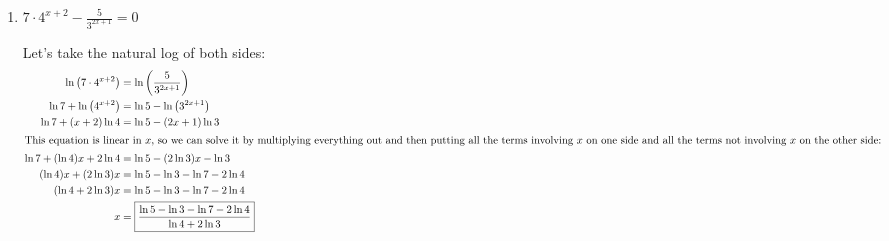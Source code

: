 \documentclass{article}
\begin{document}
\begin{enumerate}[resume]
\begin{enumerate}
    \begin{solution}
      Let's rewrite the equation so that each side consists of
      one term and then take the log base 7 of both sides.
      \begin{align*}
          49^{x} - \frac{\sqrt{7}}{7^{x^2}} &= 0 \\
          49^x &= \frac{\sqrt{7}}{7^{x^2}} \\
          \log_7(49^x) &= \log_7\!\left(\frac{\sqrt{7}}{7^{x^2}}\right)\\
          \log_7 (49^x) &= \log_7 \sqrt{7} - 
            \log_7 \left(7^{x^2}\right)\\
          x \log_7 49 &= \log_7 \sqrt{7} - x^2 \log_7 7 \\
          2x &= \tfrac{1}{2} - x^2
      \end{align*}
      We can solve this quadratic equation for $x$ using
      the quadratic formula.
      \begin{align*}
          x^2 + 2x - \tfrac{1}{2} &= 0 \\
          x &= \frac{-2 \pm \sqrt{(2)^2 - 4(1)(-\tfrac{1}{2})}}{2(1)} \\
          x &= \boxed{\frac{-2 \pm \sqrt{6}}{2}}
      \end{align*}

      
    \end{solution}

  \item

    \begin{problem}[\vfill]
      $\displaystyle 7 \cdot 4^{x + 2} - \frac{5}{3^{2x + 1}} = 0$
    \end{problem}

    \begin{solution}
      Let's take the natural log of both sides:
      \begin{align*}
        \ln \left( 7 \cdot 4^{x + 2} \right) &= \ln \left(
          \frac{5}{3^{2x + 1}} \right) \\
        \ln 7 + \ln \left( 4^{x + 2} \right) &= \ln 5 - \ln \left( 3^{2x
            + 1} \right) \\
        \ln 7 + (x + 2) \ln 4 &= \ln 5 - (2x + 1) \ln 3 \\
        \intertext{This equation is linear in $x$, so we can solve it by multiplying everything out and then putting all the terms involving $x$ on one side and all the terms not involving $x$ on the other side:}
        \ln 7 + (\ln 4) x + 2 \ln 4 &= \ln 5 - (2 \ln 3) x - \ln 3 \\
        (\ln 4) x + (2 \ln 3) x &= \ln 5 - \ln 3 - \ln 7 - 2 \ln 4 \\
        (\ln 4 + 2 \ln 3) x &= \ln 5 - \ln 3 - \ln 7 - 2 \ln 4 \\
        x &= \boxed{\frac{\ln 5 - \ln 3 - \ln 7 - 2 \ln 4}{\ln 4 + 2 \ln 3}}
      \end{align*}
    \end{solution}

  \end{enumerate}    

\end{enumerate}
\end{document}
